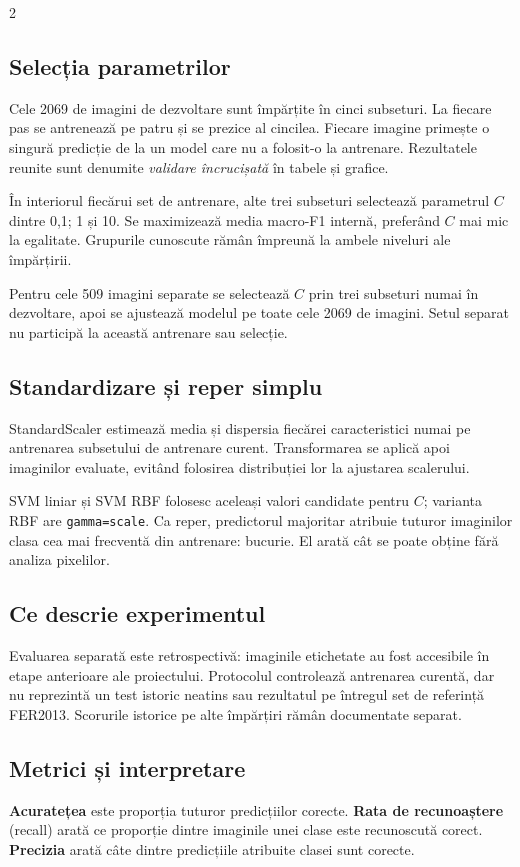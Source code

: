 \documentclass[10pt,a4paper]{article}
\begin{document}
\begin{multicols}{2}\RaggedRight
\subsection{Selecția parametrilor}
Cele 2069 de imagini de dezvoltare sunt împărțite în cinci subseturi. La fiecare pas se antrenează pe patru și se prezice al
cincilea. Fiecare imagine primește o singură predicție de la un model care
nu a folosit-o la antrenare. Rezultatele reunite sunt denumite
\emph{validare încrucișată} în tabele și grafice.

În interiorul fiecărui set de antrenare, alte trei subseturi selectează
parametrul $C$ dintre 0,1; 1 și 10. Se maximizează media macro-F1 internă,
preferând $C$ mai mic la egalitate. Grupurile cunoscute rămân împreună la
ambele niveluri ale împărțirii.

Pentru cele 509 imagini separate se selectează $C$ prin trei subseturi numai
în dezvoltare, apoi se ajustează modelul pe toate cele 2069 de imagini.
Setul separat nu participă la această antrenare sau selecție.

\subsection{Standardizare și reper simplu}
StandardScaler estimează media și dispersia fiecărei caracteristici numai
pe antrenarea subsetului de antrenare curent. Transformarea se aplică apoi imaginilor
evaluate, evitând folosirea distribuției lor la ajustarea scalerului.

SVM liniar și SVM RBF folosesc aceleași valori candidate pentru $C$;
varianta RBF are \texttt{gamma=scale}. Ca reper, predictorul majoritar
atribuie tuturor imaginilor clasa cea mai frecventă din antrenare: bucurie.
El arată cât se poate obține fără analiza pixelilor.

\subsection{Ce descrie experimentul}
Evaluarea separată este retrospectivă: imaginile etichetate au fost
accesibile în etape anterioare ale proiectului. Protocolul controlează
antrenarea curentă, dar nu reprezintă un test istoric neatins sau rezultatul
pe întregul set de referință FER2013. Scorurile istorice pe alte împărțiri rămân
documentate separat.

\columnbreak
\subsection{Metrici și interpretare}
\textbf{Acuratețea} este proporția tuturor predicțiilor corecte.
\textbf{Rata de recunoaștere} (recall) arată ce proporție dintre imaginile
unei clase este recunoscută corect. \textbf{Precizia} arată câte dintre predicțiile
atribuite clasei sunt corecte.


\end{multicols}
\end{document}
